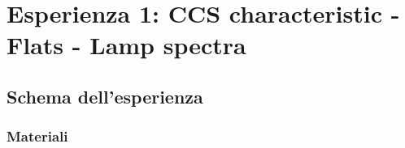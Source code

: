 \documentclass[main.tex]{subfiles}
\begin{document}

\chapter{Esperienza 1: CCS characteristic - Flats - Lamp spectra}

\section{Schema dell'esperienza}

\subsection{Materiali}

\end{document}
